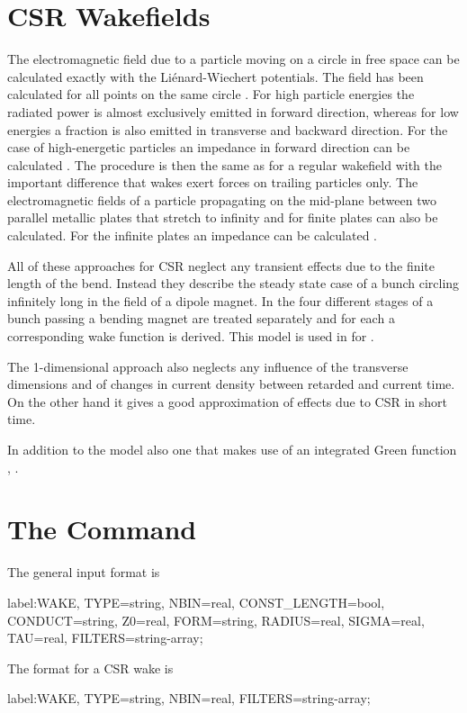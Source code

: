 \section{CSR Wakefields}
The electromagnetic field due to a particle moving on a circle in free space can be calculated exactly with the Li\'enard-Wiechert potentials. The field has been calculated for all points on the same circle \cite{bib:schott,bib:schwinger1949}. For high particle energies the radiated power is almost exclusively emitted in forward direction, whereas for low energies a fraction is also emitted in transverse and backward direction. For the case of high-energetic particles an impedance in forward direction can be calculated \cite{bib:murphy1997}. The procedure is then the same as for a regular wakefield with the important difference that wakes exert forces on trailing particles only. The electromagnetic fields of a particle propagating on the mid-plane between two parallel metallic plates that stretch to infinity \cite{bib:schwinger1949} and for finite plates \cite{bib:nodvick1954} can also be calculated. For the infinite plates an impedance can be calculated \cite{bib:murphy1997}.

All of these approaches for CSR neglect any transient effects due to the finite length of the bend. Instead they describe the steady state case of a bunch circling infinitely long in the field of a dipole magnet. In \cite{bib:saldin1997} the four different stages of a bunch passing a bending magnet are treated separately and for each a corresponding wake function is derived. This model is used in \opalt for .

The 1-dimensional approach also neglects any influence of the transverse dimensions and of changes in current density between retarded and current time. On the other hand it gives a good approximation of effects due to CSR in short time.

In addition to the  model also one that makes use of an integrated Green function  \cite{bib:mitchell2013}, .

\section{The  Command}
\label{sec:wakecmd}
The general input format is
\begin{example}
label:WAKE, TYPE=string, NBIN=real, CONST_LENGTH=bool,
      CONDUCT=string, Z0=real, FORM=string, RADIUS=real,
      SIGMA=real, TAU=real, FILTERS=string-array;
\end{example}
The format for a CSR wake is
\begin{example}
label:WAKE, TYPE=string, NBIN=real, FILTERS=string-array;
\end{example}

